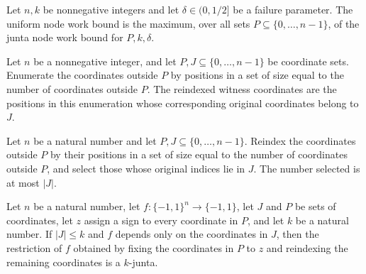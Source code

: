 \begin{definition}
\label{FABL.lowDegreeJuntaNodeUniformWorkBound}
\leanok
{}
Let $n,k$ be nonnegative integers and let $\delta\in(0,1/2]$ be a failure parameter. The
uniform node work bound is the maximum, over all sets $P\subseteq\{0,\ldots,n-1\}$, of
the junta node work bound for $P,k,\delta$.
\end{definition}

\begin{definition}
\label{FABL.reindexedJuntaWitnessCoordinates}
\leanok
{}
Let $n$ be a nonnegative integer, and let $P,J\subseteq\{0,\ldots,n-1\}$ be coordinate
sets. Enumerate the coordinates outside $P$ by positions in a set of size equal to the
number of coordinates outside $P$. The reindexed witness coordinates are the positions
in this enumeration whose corresponding original coordinates belong to $J$.
\end{definition}

\begin{theorem}
\label{FABL.card_reindexedJuntaWitnessCoordinates_le}
\leanok
{}
Let $n$ be a natural number and let $P,J\subseteq\{0,\ldots,n-1\}$. Reindex the
coordinates outside $P$ by their positions in a set of size equal to the number of
coordinates outside $P$, and select those whose original indices lie in $J$. The number
selected is at most $|J|$.
\end{theorem}

\begin{theorem}
\label{FABL.reindexedJuntaRestriction_isKJunta}
\leanok
{}
Let $n$ be a natural number, let $f\colon\{-1,1\}^n\to\{-1,1\}$, let $J$ and $P$ be sets
of coordinates, let $z$ assign a sign to every coordinate in $P$, and let $k$ be a
natural number. If $|J|\le k$ and $f$ depends only on the coordinates in $J$, then the
restriction of $f$ obtained by fixing the coordinates in $P$ to $z$ and reindexing the
remaining coordinates is a $k$-junta.
\end{theorem}

